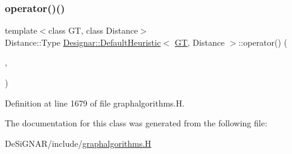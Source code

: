 \subsubsection{\texorpdfstring{operator()()}{operator()()}}
{\footnotesize\ttfamily template$<$class GT, class Distance$>$ \\
Distance\+::\+Type \hyperlink{class_designar_1_1_default_heuristic}{Designar\+::\+Default\+Heuristic}$<$ \hyperlink{demo-buildgraph_8_c_a3001c40d2c31ca87ed96cd7d1334a55e}{GT}, Distance $>$\+::operator() (\begin{DoxyParamCaption}\item[{typename \hyperlink{test-mtreenode_8_c_a17a24b0725f59987143c5faf63c4dc6f}{G\+T\+::\+Node} \&}]{,  }\item[{typename \hyperlink{test-mtreenode_8_c_a17a24b0725f59987143c5faf63c4dc6f}{G\+T\+::\+Node} \&}]{ }\end{DoxyParamCaption})\hspace{0.3cm}{\ttfamily [inline]}}



Definition at line 1679 of file graphalgorithms.\+H.



The documentation for this class was generated from the following file\+:\begin{DoxyCompactItemize}
\item 
De\+Si\+G\+N\+A\+R/include/\hyperlink{graphalgorithms_8_h}{graphalgorithms.\+H}\end{DoxyCompactItemize}
